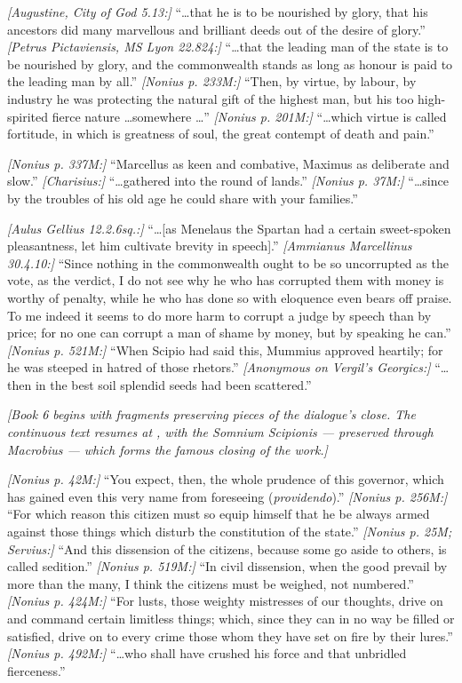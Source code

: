  \textit{[Augustine, City of God 5.13:]} ``\ldots that he is to be nourished by glory, that his ancestors did many marvellous and brilliant deeds out of the desire of glory.'' \textit{[Petrus Pictaviensis, MS Lyon 22.824:]} ``\ldots that the leading man of the state is to be nourished by glory, and the commonwealth stands as long as honour is paid to the leading man by all.'' \textit{[Nonius p. 233M:]} ``Then, by virtue, by labour, by industry he was protecting the natural gift of the highest man, but his too high-spirited fierce nature \ldots somewhere \ldots'' \textit{[Nonius p. 201M:]} ``\ldots which virtue is called fortitude, in which is greatness of soul, the great contempt of death and pain.''

 \textit{[Nonius p. 337M:]} ``Marcellus as keen and combative, Maximus as deliberate and slow.'' \textit{[Charisius:]} ``\ldots gathered into the round of lands.'' \textit{[Nonius p. 37M:]} ``\ldots since by the troubles of his old age he could share with your families.''

 \textit{[Aulus Gellius 12.2.6sq.:]} ``\ldots [as Menelaus the Spartan had a certain sweet-spoken pleasantness, let him cultivate brevity in speech].'' \textit{[Ammianus Marcellinus 30.4.10:]} ``Since nothing in the commonwealth ought to be so uncorrupted as the vote, as the verdict, I do not see why he who has corrupted them with money is worthy of penalty, while he who has done so with eloquence even bears off praise. To me indeed it seems to do more harm to corrupt a judge by speech than by price; for no one can corrupt a man of shame by money, but by speaking he can.'' \textit{[Nonius p. 521M:]} ``When Scipio had said this, Mummius approved heartily; for he was steeped in hatred of those rhetors.'' \textit{[Anonymous on Vergil's Georgics:]} ``\ldots then in the best soil splendid seeds had been scattered.''


\noindent\textit{[Book 6 begins with fragments preserving pieces of the dialogue's close. The continuous text resumes at , with the Somnium Scipionis --- preserved through Macrobius --- which forms the famous closing of the work.]}

 \textit{[Nonius p. 42M:]} ``You expect, then, the whole prudence of this governor, which has gained even this very name from foreseeing (\textit{providendo}).'' \textit{[Nonius p. 256M:]} ``For which reason this citizen must so equip himself that he be always armed against those things which disturb the constitution of the state.'' \textit{[Nonius p. 25M; Servius:]} ``And this dissension of the citizens, because some go aside to others, is called sedition.'' \textit{[Nonius p. 519M:]} ``In civil dissension, when the good prevail by more than the many, I think the citizens must be weighed, not numbered.'' \textit{[Nonius p. 424M:]} ``For lusts, those weighty mistresses of our thoughts, drive on and command certain limitless things; which, since they can in no way be filled or satisfied, drive on to every crime those whom they have set on fire by their lures.'' \textit{[Nonius p. 492M:]} ``\ldots who shall have crushed his force and that unbridled fierceness.''

